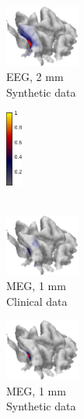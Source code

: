 \documentclass[5p]{elsarticle}
\begin{document}
\begin{figure}[h!]
\begin{footnotesize}
\begin{center}
\begin{minipage}{3cm}
\begin{center}
\end{center}\end{minipage}
\begin{minipage}{3cm} \begin{center}
\includegraphics[height=2.0cm]{CM_EEG_IG_2mm_syntheticdata.png} \\ EEG, 2 mm \\ Synthetic data
\end{center}\end{minipage}
\begin{minipage}{0.5cm} \begin{center}
\includegraphics[height=2.5cm]{colorbar.png} \\ \mbox{} \\ \mbox{}
\end{center}
\end{minipage} \vskip0.2cm
\begin{minipage}{3cm} \begin{center}
\includegraphics[height=2.0cm]{CM_MEG_IG_1mm.png} \\ MEG, 1 mm \\ Clinical data
\end{center}\end{minipage}
\begin{minipage}{3cm} \begin{center}
\includegraphics[height=2.0cm]{CM_MEG_IG_1mm_syntheticdata.png} \\ MEG, 1 mm \\ Synthetic data

\end{center}
\end{minipage}
\end{center}
\end{footnotesize}
\end{figure}
\end{document}
